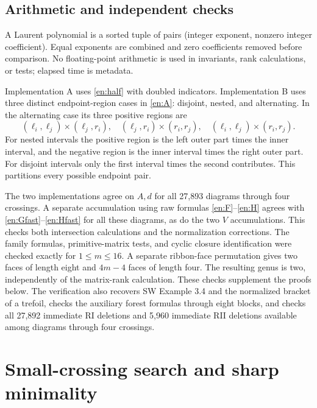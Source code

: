\documentclass[12pt]{amsart}
\theoremstyle{definition}
\theoremstyle{remark}
\numberwithin{equation}{section}
\begin{document}
\subsection{Arithmetic and independent checks}
A Laurent polynomial is a sorted tuple of pairs (integer exponent,
nonzero integer coefficient). Equal exponents are combined and zero
coefficients removed before comparison. No floating-point arithmetic is
used in invariants, rank calculations, or tests; elapsed time is metadata.

Implementation A uses \eqref{en:half} with doubled indicators.
Implementation B uses three distinct endpoint-region cases in
\eqref{en:A}: disjoint, nested, and alternating. In the alternating case
its three positive regions are
\[
(\ell_i,\ell_j)\times(\ell_j,r_i),\quad
(\ell_j,r_i)\times(r_i,r_j),\quad
(\ell_i,\ell_j)\times(r_i,r_j).
\]
For nested intervals the positive region is the left outer part times the
inner interval, and the negative region is the inner interval times the
right outer part. For disjoint intervals only the first interval times the
second contributes. This partitions every possible endpoint pair.

The two implementations agree on $A,d$ for all 27,893 diagrams through
four crossings. A separate accumulation using raw formulas
\eqref{en:F}--\eqref{en:H} agrees with
\eqref{en:Gfast}--\eqref{en:Hfast} for all these diagrams, as do the two
$V$ accumulations. This checks both intersection calculations and the
normalization corrections. The family formulas, primitive-matrix tests,
and cyclic closure identification were checked exactly for $1\le m\le16$.
A separate ribbon-face permutation gives two faces of length eight and
$4m-4$ faces of length four. The resulting genus is two, independently of
the matrix-rank calculation. These checks supplement the proofs below.
The verification also recovers SW Example 3.4 and the normalized bracket
of a trefoil, checks the auxiliary forest formulas through eight blocks,
and checks all 27,892 immediate RI deletions and 5,960 immediate RII
deletions available among diagrams through four crossings.

\section{Small-crossing search and sharp minimality}
\end{document}
